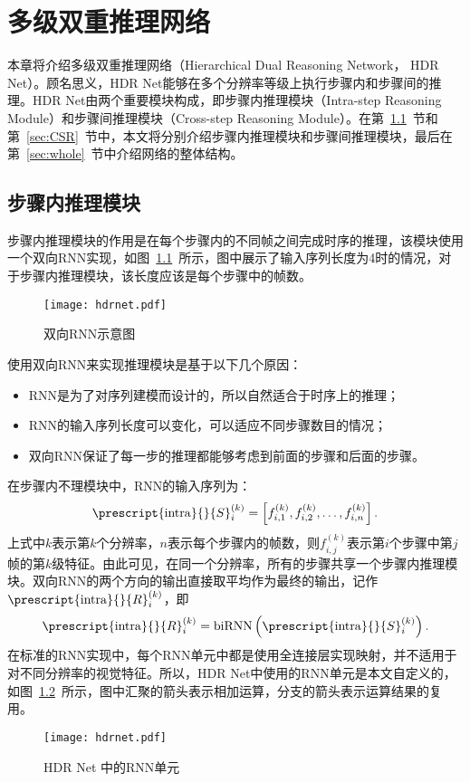 
\chapter{多级双重推理网络}\label{cha:HDRNet}
本章将介绍多级双重推理网络（Hierarchical Dual Reasoning Network， HDR Net）。顾名思义，HDR Net能够在多个分辨率等级上执行步骤内和步骤间的推理。HDR Net由两个重要模块构成，即步骤内推理模块（Intra-step Reasoning Module）和步骤间推理模块（Cross-step Reasoning Module）。在第~\ref{sec:ISR}~节和第~\ref{sec:CSR}~节中，本文将分别介绍步骤内推理模块和步骤间推理模块，最后在第~\ref{sec:whole}~节中介绍网络的整体结构。
\section{步骤内推理模块}\label{sec:ISR}
步骤内推理模块的作用是在每个步骤内的不同帧之间完成时序的推理，该模块使用一个双向RNN实现，如图~\ref{fig:birnn}~所示，图中展示了输入序列长度为4时的情况，对于步骤内推理模块，该长度应该是每个步骤中的帧数。
\begin{figure}[htbp]
    \centering
    \texttt{[image: hdrnet.pdf]}
    \caption{双向RNN示意图}
    \label{fig:birnn}
\end{figure}
使用双向RNN来实现推理模块是基于以下几个原因：
\begin{itemize}
    \item RNN是为了对序列建模而设计的，所以自然适合于时序上的推理；
    \item RNN的输入序列长度可以变化，可以适应不同步骤数目的情况；
    \item 双向RNN保证了每一步的推理都能够考虑到前面的步骤和后面的步骤。
\end{itemize}

在步骤内不理模块中，RNN的输入序列为：
\begin{equation}
    \prescript{\intra}{}{S}^{(k)}_i = \left[f^{(k)}_{i, 1}, f^{(k)}_{i, 2}, \ldots, f^{(k)}_{i, n}\right].
\end{equation}
上式中$k$表示第$k$个分辨率，$n$表示每个步骤内的帧数，则$f^{(k)}_{i, j}$表示第$i$个步骤中第$j$帧的第$k$级特征。由此可见，在同一个分辨率，所有的步骤共享一个步骤内推理模块。双向RNN的两个方向的输出直接取平均作为最终的输出，记作$\prescript{\intra}{}{R}^{(k)}_i$，即
\begin{equation}
    \prescript{\intra}{}{R}^{(k)}_i = \birnn\left(\prescript{\intra}{}{S}^{(k)}_i\right).
\end{equation}
在标准的RNN实现中，每个RNN单元中都是使用全连接层实现映射，并不适用于对不同分辨率的视觉特征。所以，HDR Net中使用的RNN单元是本文自定义的，如图~\ref{fig:rnn_cell}~所示，图中汇聚的箭头表示相加运算，分支的箭头表示运算结果的复用。
\begin{figure}[htbp]
    \centering
    \texttt{[image: hdrnet.pdf]}
    \caption{HDR Net 中的RNN单元}
    \label{fig:rnn_cell}
\end{figure}

